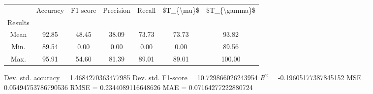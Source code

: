 \begin{tabular}{|c|c|c|c|c|c|c|}
\toprule
{} &  Accuracy &  F1 score &  Precision &  Recall &  \$T\_\{\textbackslash mu\}\$ &  \$T\_\{\textbackslash gamma\}\$ \\
Results &           &           &            &         &            &               \\
\hline
Mean    &     92.85 &     48.45 &      38.09 &   73.73 &      73.73 &         93.82 \\
Min.    &     89.54 &      0.00 &       0.00 &    0.00 &       0.00 &         89.56 \\
Max.    &     95.91 &     54.60 &      81.39 &   89.01 &      89.01 &        100.00 \\
\bottomrule
\end{tabular}

 Dev. std. accuracy = 1.4684270363477985
 Dev. std. F1-score = 10.729866026243954
 $R^2$ = -0.19605177387845152
 MSE = 0.05494753786790536
 RMSE = 0.2344089116648626
 MAE = 0.07164277222880724